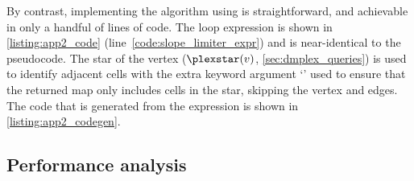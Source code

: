 \documentclass[thesis]{subfiles}
\begin{document}

By contrast, implementing the algorithm using  is straightforward, and achievable in only a handful of lines of code.
The loop expression is shown in \cref{listing:app2_code} (line~\ref{code:slope_limiter_expr}) and is near-identical to the pseudocode.
The star of the vertex ($\plexstar(v)$, \cref{sec:dmplex_queries}) is used to identify adjacent cells with the extra keyword argument `' used to ensure that the returned map only includes cells in the star, skipping the vertex and edges.
The code that is generated from the expression is shown in \cref{listing:app2_codegen}.

\subsection{Performance analysis}

\end{document}
